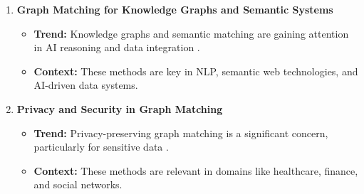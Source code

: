 \begin{enumerate}
            \item \textbf{Graph Matching for Knowledge Graphs and Semantic Systems}
            \begin{itemize}
                \item \textbf{Trend:} Knowledge graphs and semantic matching are gaining attention in AI reasoning and data integration \cite{knowledge_graph_matching}.
                \item \textbf{Context:} These methods are key in NLP, semantic web technologies, and AI-driven data systems.
            \end{itemize}
        
            \item \textbf{Privacy and Security in Graph Matching}
            \begin{itemize}
                \item \textbf{Trend:} Privacy-preserving graph matching is a significant concern, particularly for sensitive data \cite{privacy_graph_matching}.
                \item \textbf{Context:} These methods are relevant in domains like healthcare, finance, and social networks.
            \end{itemize}
        \end{enumerate}
        